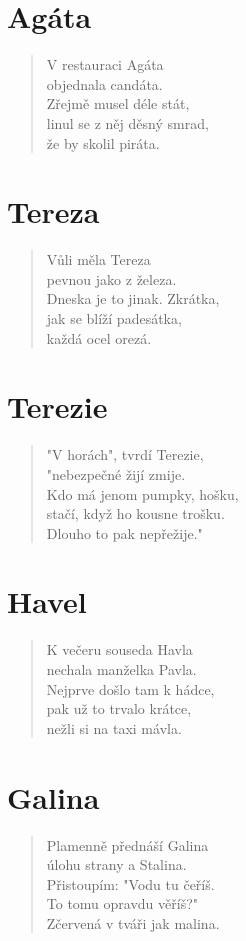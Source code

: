 \section*{Agáta}
\begin{verse}
V restauraci Agáta\\
objednala candáta.\\
Zřejmě musel déle stát,\\
linul se z něj děsný smrad,\\
že by skolil piráta.
\end{verse}

\section*{Tereza}
\begin{verse}
Vůli měla Tereza\\
pevnou jako z železa.\\
Dneska je to jinak. Zkrátka,\\
jak se blíží padesátka,\\
každá ocel orezá.
\end{verse}

\section*{Terezie}
\begin{verse}
"V horách", tvrdí Terezie,\\
"nebezpečné žijí zmije.\\
Kdo má jenom pumpky, hošku,\\
stačí, když ho kousne trošku.\\
Dlouho to pak nepřežije."
\end{verse}

\section*{Havel}
\begin{verse}
K večeru souseda Havla\\
nechala manželka Pavla.\\
Nejprve došlo tam k hádce,\\
pak už to trvalo krátce,\\
nežli si na taxi mávla.
\end{verse}

\section*{Galina}
\begin{verse}
Plamenně přednáší Galina\\
úlohu strany a Stalina.\\
Přistoupím: "Vodu tu čeříš.\\
To tomu opravdu věříš?"\\
Zčervená v tváři jak malina.
\end{verse}

